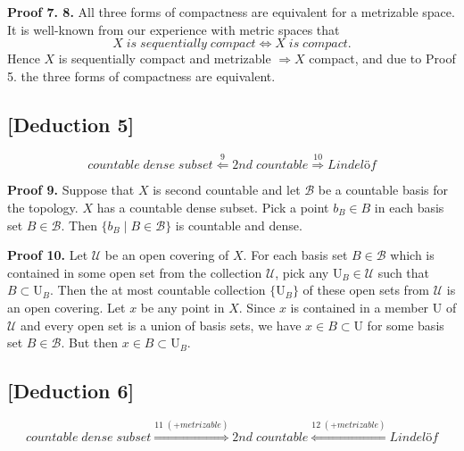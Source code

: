 \documentclass[11pt]{diazessay} %
\begin{document}
\vskip	10pt
\textbf{Proof 7. 8.} All three forms of compactness are equivalent for a metrizable space. 
It is well-known from our experience with metric spaces that 
\begin{equation*}
	X \; is \; sequentially \; compact \iff X \; is \; compact.
\end{equation*}
\noindent
Hence $X$ is sequentially compact and metrizable $\Rightarrow X$ compact, and due to Proof 5. the three forms of compactness are equivalent.

\vskip 10pt
\subsection*{[Deduction 5]}
\vskip -10pt
\begin{equation}
	countable \; dense \; subset \overset{9}{\Longleftarrow} 2nd \; countable \overset{10}{\Longrightarrow} Lindel\textit{ö}f
\end{equation}

\vskip 10pt
\textbf{Proof 9.} Suppose that $X$ is second countable and let $\mathcal{B}$ be a countable basis for the topology.
$X$ has a countable dense subset. Pick a point $b_B \in B$ in each basis set $B \in \mathcal{B}$. Then $\{b_B \; | \; B \in \mathcal{B}\}$ is
countable and dense.

\vskip 10pt
\textbf{Proof 10.} Let $\mathcal{U}$ be an open covering of $X$. For each basis set $B \in \mathcal{B}$ which is contained in some open
set from the collection $\mathcal{U}$, pick any $\mathrm{U}_B \in \mathcal{U}$ such that $B \subset \mathrm{U}_B$. Then the at most countable collection
$\{\mathrm{U}_B\}$ of these open sets from $\mathcal{U}$ is an open covering. Let $x$ be any point in $X$. Since $x$ is contained in a
member $\mathrm{U}$ of $\mathcal{U}$ and every open set is a union of basis sets, we have $x \in B \subset \mathrm{U}$ for some basis set $B \in \mathcal{B}$.
But then $x \in B \subset \mathrm{U}_B$.

\vskip 10pt
\subsection*{[Deduction 6]}
\vskip -10pt
\begin{equation}
	countable \; dense \; subset \overset{11\; (+metrizable)}{\Longrightarrow} 2nd \; countable \overset{12\; (+metrizable)}{\Longleftarrow} Lindel\textit{ö}f
\end{equation}
\end{document}
